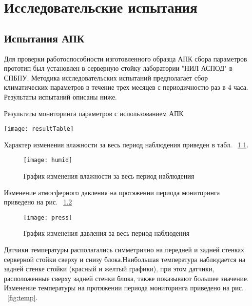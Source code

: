 
\chapter{Исследовательские испытания}


\section{Испытания АПК}
Для проверки работоспособности изготовленного образца АПК сбора параметров прототип был установлен в серверную стойку лаборатории "НИЛ АСПОД" в СПБПУ. Методика исследовательских испытаний предполагает сбор климатических параметров в течение трех месяцев с периодичностю раз в 4 часа. Результаты испытаний описаны ниже.
 
\begin{table}
	\captionsetup{skip=5pt}
	\caption{Результаты мониторинга параметров с использованием АПК}
	\centering
	\texttt{[image: resultTable]}
	\label{tab:result}
\end{table}

Характер  изменения влажности  за  весь  период  наблюдения  приведен в табл. ~\ref{fig:humid}.

\begin{figure}[h]
	\centering
	\texttt{[image: humid]}
	\caption{График изменения влажности за весь период наблюдения}
	\label{fig:humid}
\end{figure}

Изменение  атмосферного давления  на протяжении периода мониторинга приведено на рис. ~\ref{fig:press}

 \begin{figure}[h]
 	\centering
 	\texttt{[image: press]}
 	\caption{График изменения давления за весь период наблюдения}
 	\label{fig:press}
 \end{figure}

Датчики  температуры  располагались  симметрично  на  передней  и задней стенках серверной стойки сверху и снизу блока.Наибольшая  температура  наблюдается  на  задней  стенке  стойки (красный и желтый графики),  при этом датчики, расположенные сверху задней стенки блока, также показывают большее  значение.  Изменение  температуры  на  протяжении  периода 
мониторинга приведено на рис. ~\ref{fig:temp}.


